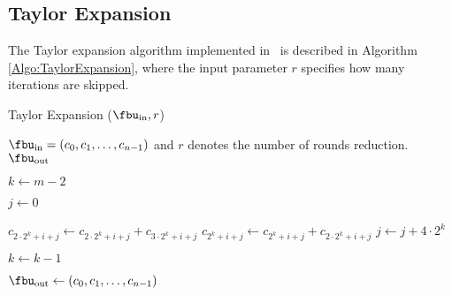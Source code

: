


\subsection{Taylor Expansion} \label{sec:Taylor Expansion}

The Taylor expansion algorithm implemented in~\cite{libiop} is described in Algorithm \ref{Algo:TaylorExpansion}, where the input parameter $r$ specifies how many iterations are skipped. 



\begin{algorithm}[h]
	\caption{Taylor Expansion ($\fbu_\text{in}, r$)}
	\label{Algo:TaylorExpansion}
	\begin{algorithmic}[1]
		\Require $\fbu_\text{in} = (c_0,c_1,\ldots,c_{n-1})$ and $r$ denotes the number of rounds reduction.
		\Ensure $\fbu_\text{out}$
		
		\State $k \gets m - 2$
		
		\State $j \gets 0$
		
		\State $c_{2\cdot2^k + i + j} \gets c_{2\cdot2^k + i + j} + c_{3\cdot2^k + i + j}$
		\State $c_{2^k + i + j} \gets c_{2^k + i + j} + c_{2\cdot2^k + i + j}$
		\EndFor
		\State $j \gets j + 4\cdot2^k$ 
		\EndWhile
		
		\State $k \gets k - 1$
		\EndWhile
		
		\State \Return $\fbu_\text{out} \gets (c_0,c_1,\ldots,c_{n-1})$
	\end{algorithmic}
\end{algorithm}


